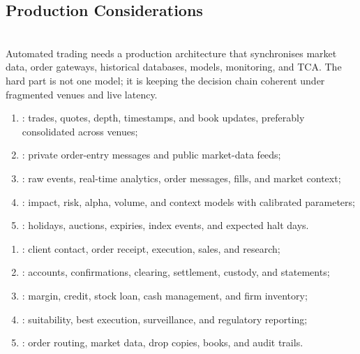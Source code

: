 \documentclass[a4paper,oneside,openany]{book}
\begin{document}
\subsection*{Production Considerations}

\begin{principle} \\
Automated trading needs a production architecture that synchronises market data, order gateways, historical databases, models, monitoring, and TCA. The hard part is not one model; it is keeping the decision chain coherent under fragmented venues and live latency.
\end{principle}

\begin{taxonomy} 
\begin{enumerate}[label=\roman*.]
\setlength{\itemsep}{0pt}
\item {}: trades, quotes, depth, timestamps, and book updates, preferably consolidated across venues;
\item {}: private order-entry messages and public market-data feeds;
\item {}: raw events, real-time analytics, order messages, fills, and market context;
\item {}: impact, risk, alpha, volume, and context models with calibrated parameters;
\item {}: holidays, auctions, expiries, index events, and expected halt days.
\end{enumerate}
\end{taxonomy}

\begin{taxonomy} 
\begin{enumerate}[label=\roman*.]
\setlength{\itemsep}{0pt}
\item {}: client contact, order receipt, execution, sales, and research;
\item {}: accounts, confirmations, clearing, settlement, custody, and statements;
\item {}: margin, credit, stock loan, cash management, and firm inventory;
\item {}: suitability, best execution, surveillance, and regulatory reporting;
\item {}: order routing, market data, drop copies, books, and audit trails.
\end{enumerate}
\end{taxonomy}
\end{document}
